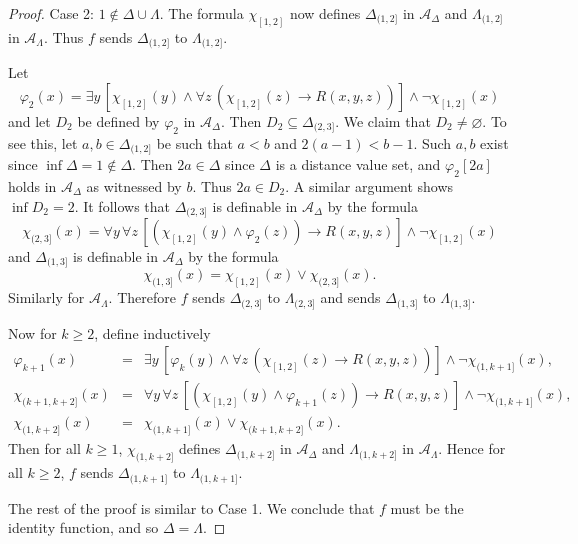 \documentclass[10pt,a4paper]{amsart}
\begin{document}
\begin{proof}
{\sc Case 2}: $1\not\in \Delta\cup\Lambda$. The formula $\chi_{[1,2]}$ now defines $\Delta_{(1,2]}$ in $\mathcal{A}_\Delta$ and $\Lambda_{(1,2]}$ in $\mathcal{A}_\Lambda$. Thus $f$ sends $\Delta_{(1,2]}$ to $\Lambda_{(1,2]}$. 

Let
$$ \varphi_2(x)=\exists y\, [\chi_{[1,2]}(y)\wedge\forall z\,(\chi_{[1,2]}(z)\rightarrow R(x,y,z))]\wedge \neg \chi_{[1,2]}(x) $$
and let $D_2$ be defined by $\varphi_2$ in $\mathcal{A}_\Delta$. Then $D_2\subseteq\Delta_{(2,3]}$. We claim that $D_2\neq \varnothing$.  To see this, let $a, b\in \Delta_{(1,2]}$ be such that $a<b$ and $2(a-1)<b-1$. Such $a, b$ exist since $\inf\Delta=1\not\in \Delta$.  Then $2a\in\Delta$ since $\Delta$ is a distance value set, and $\varphi_2[2a]$ holds in $\mathcal{A}_\Delta$ as witnessed by $b$. Thus $2a\in D_2$. A similar argument shows $\inf D_2=2$. It follows that $\Delta_{(2,3]}$ is definable in $\mathcal{A}_\Delta$ by the formula
$$ \chi_{(2,3]}(x)=\forall y\, \forall z\, [(\chi_{[1,2]}(y)\wedge \varphi_2(z))\rightarrow R(x,y,z)]\wedge \neg\chi_{[1,2]}(x) $$
and $\Delta_{(1,3]}$ is definable in $\mathcal{A}_\Delta$ by the formula
$$ \chi_{(1,3]}(x)=\chi_{[1,2]}(x)\vee \chi_{(2,3]}(x). $$
Similarly for $\mathcal{A}_\Lambda$. Therefore $f$ sends $\Delta_{(2,3]}$ to $\Lambda_{(2,3]}$ and sends $\Delta_{(1,3]}$ to $\Lambda_{(1,3]}$.

Now for $k\geq 2$, define inductively
$$\begin{array}{rcl} \varphi_{k+1}(x)&=&\exists y\, [\varphi_k(y) \wedge \forall z\, (\chi_{[1,2]}(z)\rightarrow R(x,y,z))]\wedge \neg\chi_{(1,k+1]}(x), \\
\chi_{(k+1,k+2]}(x)&=&\forall y\, \forall z\, [(\chi_{[1,2]}(y)\wedge \varphi_{k+1}(z))\rightarrow R(x,y,z)]\wedge \neg\chi_{(1,k+1]}(x), \\
\chi_{(1,k+2]}(x)&=& \chi_{(1,k+1]}(x)\vee \chi_{(k+1,k+2]}(x). 
\end{array} $$ 
Then for all $k\geq 1$, $\chi_{(1,k+2]}$ defines $\Delta_{(1,k+2]}$ in $\mathcal{A}_\Delta$ and $\Lambda_{(1,k+2]}$ in $\mathcal{A}_\Lambda$. Hence for all $k\geq 2$, $f$ sends $\Delta_{(1,k+1]}$ to $\Lambda_{(1,k+1]}$. 

The rest of the proof is similar to Case 1. We conclude that $f$ must be the identity function, and so $\Delta=\Lambda$.
\end{proof}
\end{document}
